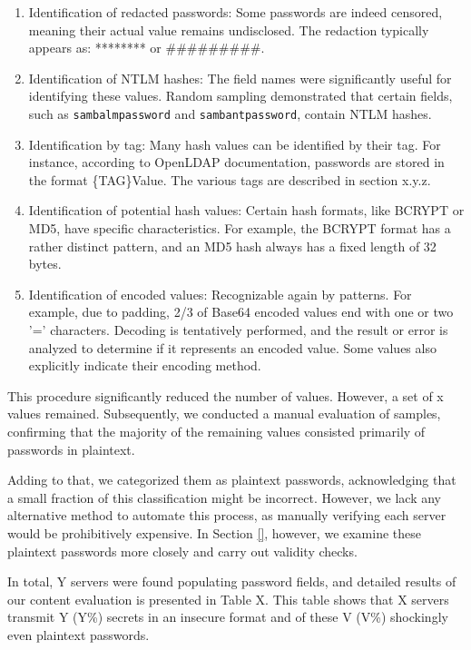 \begin{enumerate}
    \item Identification of redacted passwords: Some passwords are indeed censored, meaning their actual value remains undisclosed. The redaction typically appears as: ******** or \#\#\#\#\#\#\#\#\#.
    \item Identification of NTLM hashes: The field names were significantly useful for identifying these values. Random sampling demonstrated that certain fields, such as \texttt{sambalmpassword} and \texttt{sambantpassword}, contain NTLM hashes.
    \item Identification by tag: Many hash values can be identified by their tag. For instance, according to OpenLDAP documentation, passwords are stored in the format \{TAG\}Value. The various tags are described in section x.y.z.
    \item Identification of potential hash values: Certain hash formats, like BCRYPT or MD5, have specific characteristics. For example, the BCRYPT format has a rather distinct pattern, and an MD5 hash always has a fixed length of 32 bytes.
    \item Identification of encoded values: Recognizable again by patterns. For example, due to padding, 2/3 of Base64 encoded values end with one or two '=' characters. Decoding is tentatively performed, and the result or error is analyzed to determine if it represents an encoded value. Some values also explicitly indicate their encoding method.
\end{enumerate}

This procedure significantly reduced the number of values. However, a set of x values remained. Subsequently, we conducted a manual evaluation of samples, confirming that the majority of the remaining values consisted primarily of passwords in plaintext. 

Adding to that, we categorized them as plaintext passwords, acknowledging that a small fraction of this classification might be incorrect. However, we lack any alternative method to automate this process, as manually verifying each server would be prohibitively expensive. In Section \ref{}, however, we examine these plaintext passwords more closely and carry out validity checks.

In total, Y servers were found populating password fields, and detailed results of our content evaluation  is presented in Table X. This table shows that X servers transmit Y (Y\%) secrets in an insecure format and of these V (V\%) shockingly even plaintext passwords.

